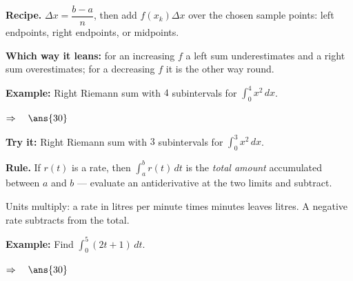 \documentclass[12pt]{article}
\begin{document}


\begin{formulabox}
\textbf{Recipe.} $\Delta x = \dfrac{b - a}{n}$, then add $f(x_k)\Delta x$ over
the chosen sample points: left endpoints, right endpoints, or midpoints.\par
\textbf{Which way it leans:} for an increasing $f$ a left sum underestimates and
a right sum overestimates; for a decreasing $f$ it is the other way round.
\end{formulabox}

\begin{examplebox}
\textbf{Example:} \quad Right Riemann sum with $4$ subintervals for
$\displaystyle\int_0^4 x^2\,dx$.

$\Rightarrow\quad \ans{30}$
\end{examplebox}

\begin{tryitbox}
\textbf{Try it:} \quad Right Riemann sum with $3$ subintervals for
$\displaystyle\int_0^3 x^2\,dx$.\\[2pt]
\end{tryitbox}


\begin{formulabox}
\textbf{Rule.} If $r(t)$ is a rate, then $\displaystyle\int_a^b r(t)\,dt$ is the
\emph{total amount} accumulated between $a$ and $b$ --- evaluate an
antiderivative at the two limits and subtract.\par
Units multiply: a rate in litres per minute times minutes leaves litres. A
negative rate subtracts from the total.
\end{formulabox}

\begin{examplebox}
\textbf{Example:} \quad Find $\displaystyle\int_0^5 (2t + 1)\,dt$.

$\Rightarrow\quad \ans{30}$
\end{examplebox}
\end{document}
